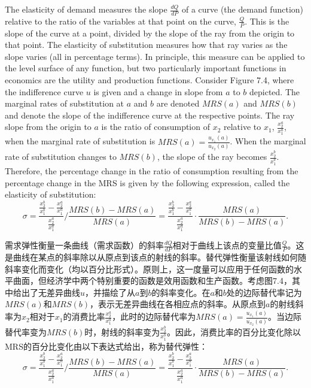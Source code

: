 \begin{original}
The elasticity of demand measures the slope $\frac{dQ}{dP}$ of a curve (the demand function) relative to the ratio of the variables at that point on the curve, $\frac{Q}{P}$. This is the slope of the curve at a point, divided by the slope of the ray from the origin to that point. The elasticity of substitution measures how that ray varies as the slope varies (all in percentage terms). In principle, this measure can be applied to the level surface of any function, but two particularly important functions in economics are the utility and production functions. Consider Figure 7.4, where the indifference curve $u$ is given and a change in slope from $a$ to $b$ depicted. The marginal rates of substitution at $a$ and $b$ are denoted $MRS(a)$ and $MRS(b)$ and denote the slope of the indifference curve at the respective points. The ray slope from the origin to $a$ is the ratio of consumption of $x_2$ relative to $x_1$, $\frac{x_2^a}{x_1^a}$, when the marginal rate of substitution is $MRS(a) = \frac{u_{x_1}(a)}{u_{x_2}(a)}$. When the marginal rate of substitution changes to $MRS(b)$, the slope of the ray becomes $\frac{x_2^b}{x_1^b}$. Therefore, the percentage change in the ratio of consumption resulting from the percentage change in the MRS is given by the following expression, called the elasticity of substitution:
\[
\sigma = \frac{\frac{x_2^b}{x_1^b} - \frac{x_2^a}{x_1^a}}{\frac{x_2^a}{x_1^a}} \Big/ \frac{MRS(b)-MRS(a)}{MRS(a)} = \frac{\frac{x_2^b}{x_1^b} - \frac{x_2^a}{x_1^a}}{\frac{x_2^a}{x_1^a}} \cdot \frac{MRS(a)}{MRS(b)-MRS(a)}. \tag{7.1}
\]
\end{original}
\begin{translation}
需求弹性衡量一条曲线（需求函数）的斜率$\frac{dQ}{dP}$相对于曲线上该点的变量比值$\frac{Q}{P}$。这是曲线在某点的斜率除以从原点到该点的射线的斜率。替代弹性衡量该射线如何随斜率变化而变化（均以百分比形式）。原则上，这一度量可以应用于任何函数的水平曲面，但经济学中两个特别重要的函数是效用函数和生产函数。考虑图7.4，其中给出了无差异曲线$u$，并描绘了从$a$到$b$的斜率变化。在$a$和$b$处的边际替代率记为$MRS(a)$和$MRS(b)$，表示无差异曲线在各相应点的斜率。从原点到$a$的射线斜率为$x_2$相对于$x_1$的消费比率$\frac{x_2^a}{x_1^a}$，此时的边际替代率为$MRS(a) = \frac{u_{x_1}(a)}{u_{x_2}(a)}$。当边际替代率变为$MRS(b)$时，射线的斜率变为$\frac{x_2^b}{x_1^b}$。因此，消费比率的百分比变化除以MRS的百分比变化由以下表达式给出，称为替代弹性：
\[
\sigma = \frac{\frac{x_2^b}{x_1^b} - \frac{x_2^a}{x_1^a}}{\frac{x_2^a}{x_1^a}} \Big/ \frac{MRS(b)-MRS(a)}{MRS(a)} = \frac{\frac{x_2^b}{x_1^b} - \frac{x_2^a}{x_1^a}}{\frac{x_2^a}{x_1^a}} \cdot \frac{MRS(a)}{MRS(b)-MRS(a)}. \tag{7.1}
\]
\end{translation}

